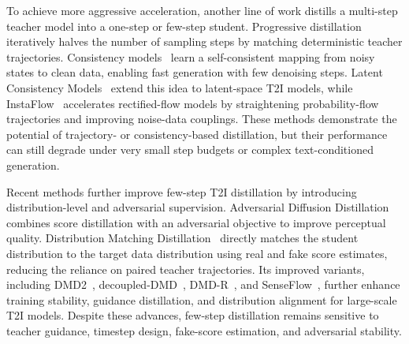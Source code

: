 To achieve more aggressive acceleration, another line of work distills a multi-step teacher model into a one-step or few-step student. Progressive distillation~\citep{progressivedistill} iteratively halves the number of sampling steps by matching deterministic teacher trajectories. Consistency models~\citep{consistency} learn a self-consistent mapping from noisy states to clean data, enabling fast generation with few denoising steps. Latent Consistency Models~\citep{latentconsistency} extend this idea to latent-space T2I models, while InstaFlow~\citep{liu2023instaflow} accelerates rectified-flow models by straightening probability-flow trajectories and improving noise-data couplings. These methods demonstrate the potential of trajectory- or consistency-based distillation, but their performance can still degrade under very small step budgets or complex text-conditioned generation.

Recent methods further improve few-step T2I distillation by introducing distribution-level and adversarial supervision. Adversarial Diffusion Distillation~\citep{add} combines score distillation with an adversarial objective to improve perceptual quality. Distribution Matching Distillation~\citep{dmd} directly matches the student distribution to the target data distribution using real and fake score estimates, reducing the reliance on paired teacher trajectories. Its improved variants, including DMD2~\citep{yin2024improved}, decoupled-DMD~\citep{decoupleddmd}, DMD-R~\citep{dmdr}, and SenseFlow~\citep{senseflow}, further enhance training stability, guidance distillation, and distribution alignment for large-scale T2I models. Despite these advances, few-step distillation remains sensitive to teacher guidance, timestep design, fake-score estimation, and adversarial stability.



